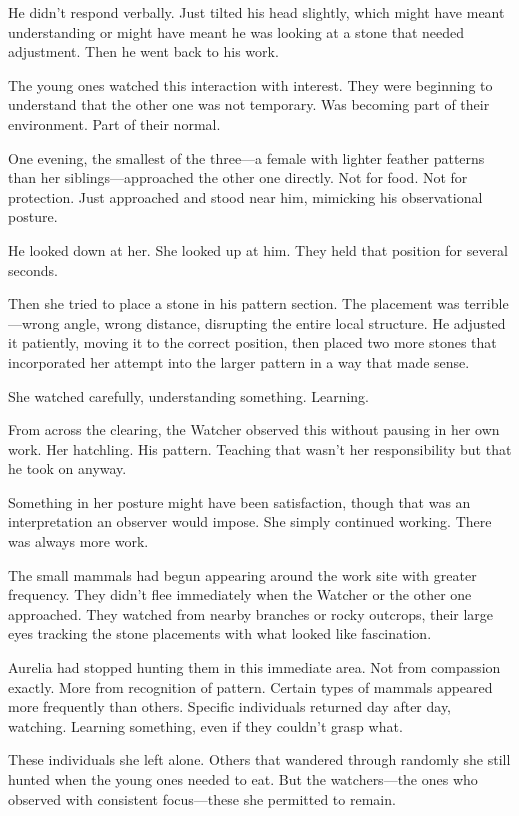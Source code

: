 He didn't respond verbally. Just tilted his head slightly, which might have meant understanding or might have meant he was looking at a stone that needed adjustment. Then he went back to his work.

The young ones watched this interaction with interest. They were beginning to understand that the other one was not temporary. Was becoming part of their environment. Part of their normal.

One evening, the smallest of the three—a female with lighter feather patterns than her siblings—approached the other one directly. Not for food. Not for protection. Just approached and stood near him, mimicking his observational posture.

He looked down at her. She looked up at him. They held that position for several seconds.

Then she tried to place a stone in his pattern section. The placement was terrible—wrong angle, wrong distance, disrupting the entire local structure. He adjusted it patiently, moving it to the correct position, then placed two more stones that incorporated her attempt into the larger pattern in a way that made sense.

She watched carefully, understanding something. Learning.

From across the clearing, the Watcher observed this without pausing in her own work. Her hatchling. His pattern. Teaching that wasn't her responsibility but that he took on anyway.

Something in her posture might have been satisfaction, though that was an interpretation an observer would impose. She simply continued working. There was always more work.

\scenebreak

The small mammals had begun appearing around the work site with greater frequency. They didn't flee immediately when the Watcher or the other one approached. They watched from nearby branches or rocky outcrops, their large eyes tracking the stone placements with what looked like fascination.

Aurelia had stopped hunting them in this immediate area. Not from compassion exactly. More from recognition of pattern. Certain types of mammals appeared more frequently than others. Specific individuals returned day after day, watching. Learning something, even if they couldn't grasp what.

These individuals she left alone. Others that wandered through randomly she still hunted when the young ones needed to eat. But the watchers—the ones who observed with consistent focus—these she permitted to remain.

